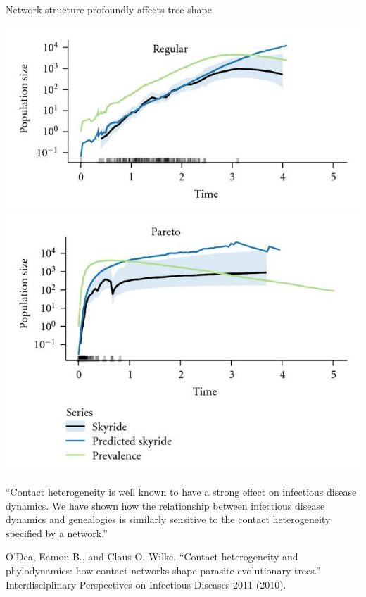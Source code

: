 \documentclass{beamer}
\begin{document}
\begin{frame}{Network structure profoundly affects tree shape}

    \includegraphics[trim=0 -1cm 0 0]{odea-f2a}\includegraphics{odea-f2d}

    \begin{center}
    ``Contact heterogeneity is well known to have a strong effect on infectious
    disease dynamics. We have shown how the relationship between infectious
    disease dynamics and genealogies is similarly sensitive to the contact
    heterogeneity specified by a network.''
    
    \tiny{O'Dea, Eamon B., and Claus O. Wilke. ``Contact heterogeneity and
        phylodynamics: how contact networks shape parasite evolutionary
        trees.'' Interdisciplinary Perspectives on Infectious Diseases 2011
    (2010).}
    \end{center}
\end{frame}
\end{document}
